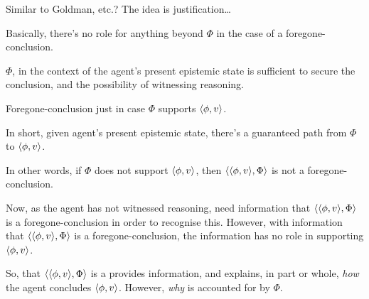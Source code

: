 \begin{note}
  Similar to Goldman, etc.?
  The idea is justification\dots
\end{note}

\begin{note}[Trimming]
  \begin{proposition}
    Basically, there's no role for anything beyond \(\Phi\) in the case of a foregone-conclusion.

    \(\Phi\), in the context of the agent's present epistemic state is sufficient to secure the conclusion, and the possibility of witnessing reasoning.
  \end{proposition}

  \begin{proposition}
    Foregone-conclusion just in case \(\Phi\) supports \(\langle \phi, v \rangle\).
    \begin{argument}
      In short, given agent's present epistemic state, there's a guaranteed path from \(\Phi\) to \(\langle \phi, v \rangle\).
    \end{argument}
    In other words, if \(\Phi\) does not support \(\langle \phi, v \rangle\), then \(\langle \langle \phi, v \rangle, \Phi \rangle\) is not a foregone-conclusion.
  \end{proposition}

  Now, as the agent has not witnessed reasoning, need information that \(\langle \langle \phi, v \rangle, \Phi \rangle\) is a foregone-conclusion in order to recognise this.
  However, with information that \(\langle \langle \phi, v \rangle, \Phi \rangle\) is a foregone-conclusion, the information has no role in supporting \(\langle \phi, v \rangle\).
\end{note}

\begin{note}
  So, that \(\langle \langle \phi, v \rangle, \Phi \rangle\) is a  provides information, and explains, in part or whole, \emph{how} the agent concludes \(\langle \phi, v \rangle\).
  However, \emph{why} is accounted for by \(\Phi\).
\end{note}

